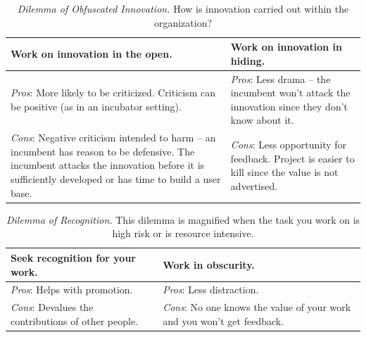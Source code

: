 \begin{center}
\begin{table}[H] %
\begin{tabular}{ | m{\dilemmatablewidth}| m{\dilemmatablewidth} | } 
  \hline
  \textbf{Work on innovation in the open.} &
  \textbf{Work on innovation in hiding.} \\
  \hline
  \textit{Pros}: More likely to be criticized. Criticism can be positive (as in an incubator setting).& 
  \textit{Pros}: Less drama -- the incumbent won't attack the innovation since they don't know about it. \\
  \hline
  \textit{Cons}: Negative criticism intended to harm -- an incumbent has reason to be defensive. The incumbent attacks the innovation before it is sufficiently developed or has time to build a user base. & 
  \textit{Cons}: Less opportunity for feedback. Project is easier to kill since the value is not advertised.\\
  \hline
\end{tabular}
\caption{\textit{Dilemma of Obfuscated Innovation.}
How is innovation carried out within the organization?
}
\label{table:innovate-open-obscure}
\end{table}
\end{center}


\begin{center}
\begin{table}[H] %
\begin{tabular}{ | m{\dilemmatablewidth}| m{\dilemmatablewidth} | } 
  \hline
  \textbf{Seek recognition for your work.} &
  \textbf{Work in obscurity.} \\
  \hline
  \textit{Pros}: Helps with promotion. & 
  \textit{Pros}: Less distraction. \\
  \hline
  \textit{Cons}: Devalues the contributions of other people. & 
  \textit{Cons}: No one knows the value of your work and you won't get feedback. \\
  \hline
\end{tabular}
\caption{\textit{Dilemma of Recognition.}
This dilemma is magnified when the task you work on is high risk or is resource intensive. 
}
\label{table:recognition-obscurity}
\end{table}
\end{center}

